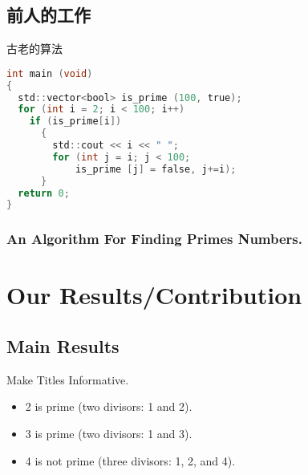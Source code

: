 \documentclass{beamer}
\begin{document}
\subsection{前人的工作}

\begin{frame}[fragile]{古老的算法}
\begin{lstlisting}[language=C]
int main (void)
{
  std::vector<bool> is_prime (100, true);
  for (int i = 2; i < 100; i++)
    if (is_prime[i])
      {
        std::cout << i << " ";
        for (int j = i; j < 100;
            is_prime [j] = false, j+=i);
      }
  return 0;
}
\end{lstlisting}
\end{frame}

\begin{frame}[fragile]
  \frametitle{An Algorithm For Finding Primes Numbers.}
\begin{semiverbatim}
\end{semiverbatim}
\end{frame}

\section{Our Results/Contribution}

\subsection{Main Results}

\begin{frame}{Make Titles Informative.}
  \begin{example}
    \begin{itemize}
    \item 2 is prime (two divisors: 1 and 2).
    \item 3 is prime (two divisors: 1 and 3).
    \item 4 is not prime (\alert{three} divisors: 1, 2, and 4).
    \end{itemize}
  \end{example}
\end{frame}
\end{document}
